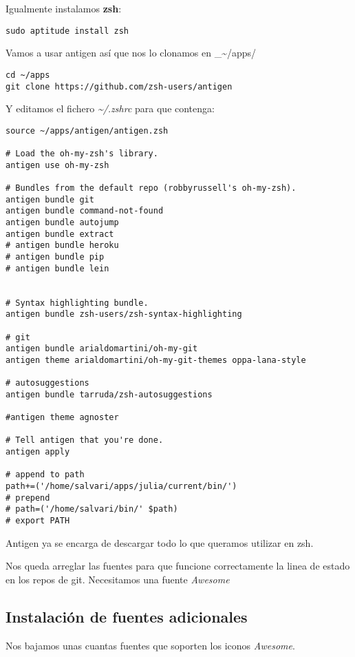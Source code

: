 \documentclass[12pt,spanish,]{article}
\begin{document}
Igualmente instalamos \textbf{zsh}:

\begin{verbatim}
sudo aptitude install zsh
\end{verbatim}

Vamos a usar antigen así que nos lo clonamos en
\_\textasciitilde{}/apps/

\begin{verbatim}
cd ~/apps
git clone https://github.com/zsh-users/antigen
\end{verbatim}

Y editamos el fichero \emph{\textasciitilde{}/.zshrc} para que contenga:

\begin{verbatim}
source ~/apps/antigen/antigen.zsh

# Load the oh-my-zsh's library.
antigen use oh-my-zsh

# Bundles from the default repo (robbyrussell's oh-my-zsh).
antigen bundle git
antigen bundle command-not-found
antigen bundle autojump
antigen bundle extract
# antigen bundle heroku
# antigen bundle pip
# antigen bundle lein


# Syntax highlighting bundle.
antigen bundle zsh-users/zsh-syntax-highlighting

# git
antigen bundle arialdomartini/oh-my-git
antigen theme arialdomartini/oh-my-git-themes oppa-lana-style

# autosuggestions
antigen bundle tarruda/zsh-autosuggestions

#antigen theme agnoster

# Tell antigen that you're done.
antigen apply

# append to path
path+=('/home/salvari/apps/julia/current/bin/')
# prepend
# path=('/home/salvari/bin/' $path)
# export PATH
\end{verbatim}

Antigen ya se encarga de descargar todo lo que queramos utilizar en zsh.

Nos queda arreglar las fuentes para que funcione correctamente la linea
de estado en los repos de git. Necesitamos una fuente \emph{Awesome}

\subsection{Instalación de fuentes
adicionales}\label{instalaciuxf3n-de-fuentes-adicionales}

Nos bajamos unas cuantas fuentes que soporten los iconos \emph{Awesome}.
\end{document}

